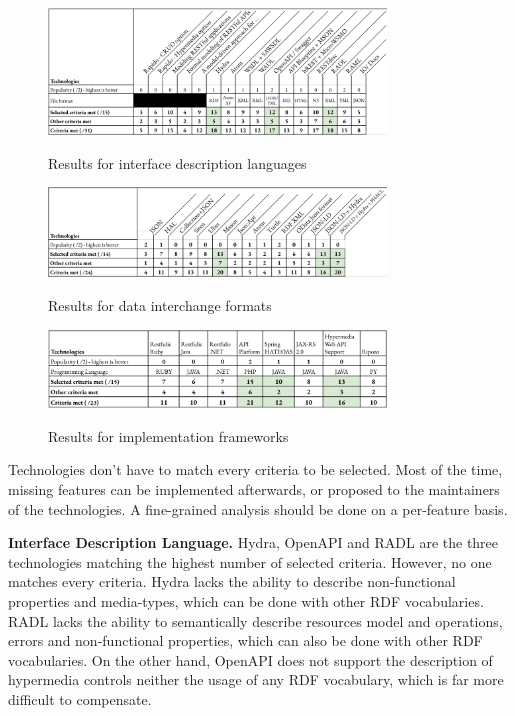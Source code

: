 \begin{figure}[ht]
\caption{Results for interface description languages}
\centering
\includegraphics[width=0.8\textwidth]{figures/example-idl-results.png}
\label{example-idl-results}
\end{figure}

\begin{figure}[ht]
\caption{Results for data interchange formats}
\centering
\includegraphics[width=0.8\textwidth]{figures/example-dif-results.png}
\label{example-dif-results}
\end{figure}

\begin{figure}[ht]
\caption{Results for implementation frameworks}
\centering
\includegraphics[width=0.8\textwidth]{figures/example-frameworks-results.png}
\label{example-frameworks-results}
\end{figure}

Technologies don't have to match every criteria to be selected. Most of the time, missing features can be implemented afterwards, or proposed to the maintainers of the technologies. A fine-grained analysis should be done on a per-feature basis.

\textbf{Interface Description Language.} Hydra, OpenAPI and RADL are the three technologies matching the highest number of selected criteria. However, no one matches every criteria. Hydra lacks the ability to describe non-functional properties and media-types, which can be done with other RDF vocabularies. RADL lacks the ability to semantically describe resources model and operations, errors and non-functional properties, which can also be done with other RDF vocabularies. On the other hand, OpenAPI does not support the description of hypermedia controls neither the usage of any RDF vocabulary, which is far more difficult to compensate. 

